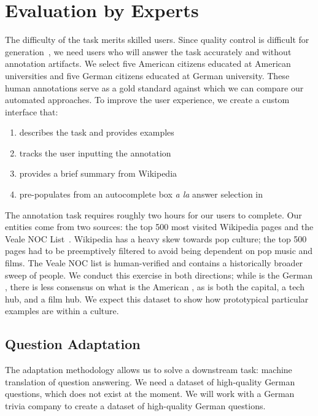 \section{Evaluation by Experts }
\label{sec:eval}

The difficulty of the task merits skilled users.  
%
Since quality control is difficult for generation~\citep{peskov2019multi}, we need users who will answer the task accurately and without annotation artifacts.
%
We select five American citizens educated at American universities and five German citizens educated at German university.  
%
These human annotations serve as a gold standard against which we can compare our automated approaches.
%
To improve the user experience, we create a custom interface that:
\begin{enumerate}[noitemsep]
	\item describes the task and provides examples
	\item tracks the user inputting the annotation
	\item provides a brief summary from Wikipedia 
	\item pre-populates from an autocomplete box \textit{a la} answer selection in \citet{wallace-19}
\end{enumerate}
%
The annotation task requires roughly two hours for our users to complete. 
%
Our entities come from two sources: the top 500 most visited Wikipedia pages and the Veale NOC List~\citep{veale2016round}.
%
Wikipedia has a heavy skew towards pop culture; the top 500 pages had to be preemptively filtered to avoid being dependent on pop music and films.
%
The Veale NOC list is human-verified and contains a historically broader sweep of people.  
%
We conduct this exercise in both directions; while  is the German , there is less consensus on what is the American , as  is both the capital, a tech hub, and a film hub.  
%
We expect this dataset to show how
prototypical particular examples are within a culture.

\subsection{Question Adaptation}

The adaptation methodology allows us to solve a downstream task: machine translation of question answering.
%
We need a dataset of high-quality German questions, which does not exist at the moment.  
%
We will work with a German trivia company to create a dataset of high-quality German questions.  

